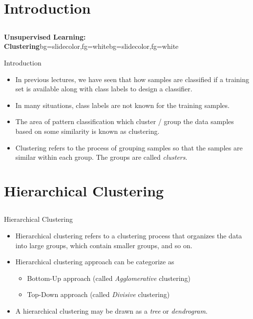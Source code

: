 \section{Introduction}
\subsection{}
\begin{frame}{}
\begin{variableblock}{\centering \Large \textbf{\vspace{4pt}\newline Unsupervised Learning: Clustering\vspace{4pt}}}{bg=slidecolor,fg=white}{bg=slidecolor,fg=white}
\end{variableblock}
\end{frame}

\begin{frame}{Introduction}
\begin{itemize}
\item In previous lectures, we have seen that how samples are classified if a training set is available along with class labels to design a classifier.
\item In many situations, class labels are not known for the training samples.
\item The area of pattern classification which {\color{mycolor1}cluster / group the data samples} based on some {\color{mycolor1}similarity} is known as {\color{mycolor2}clustering}.
\item Clustering refers to the process of grouping samples so that the samples are similar within each group. The groups are called \textit{\color{mycolor2}clusters}.
\end{itemize}
\end{frame}

\section{Hierarchical Clustering}
\subsection{}
\begin{frame}{Hierarchical Clustering}
\begin{itemize}
\item Hierarchical clustering refers to a clustering process that organizes the data into large groups, which contain smaller groups, and so on.
\item Hierarchical clustering approach can be categorize as
\begin{itemize}
\item Bottom-Up approach (called \textit{\color{slidecolor}Agglomerative} clustering)
\item Top-Down approach (called \textit{\color{slidecolor}Divisive} clustering)
\end{itemize}
\item A hierarchical clustering may be drawn as a \textit{\color{slidecolor}tree} or \textit{\color{slidecolor}dendrogram}.
\end{itemize}
\end{frame}

